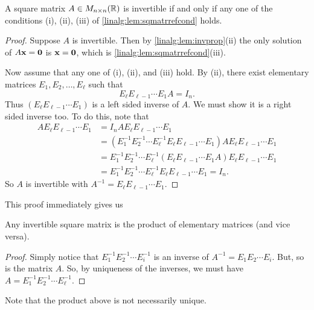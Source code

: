 \documentclass[10pt, a4paper]{article}
\begin{document}
\begin{theorem}\label{linalg:thm:fundthmofinvertmatr}
    A square matrix $A \in M_{n \times n}(\mathbb{R})$ is invertible if and only if any one of the conditions (i), (ii), (iii) of \autoref{linalg:lem:sqmatrrefcond} holds.
    \begin{proof}
        Suppose $A$ is invertible.
        Then by \autoref{linalg:lem:invprop}(ii) the only solution of $A\mathbf{x} = \mathbf{0}$ is $\mathbf{x} = \mathbf{0}$,
        which is \autoref{linalg:lem:sqmatrrefcond}(iii).

        Now assume that any one of (i), (ii), and (iii) hold.
        By (ii), there exist elementary matrices $E_1, E_2, \dotsc, E_\ell$ such that
        \[
        E_\ell E_{\ell - 1} \dotsi E_1 A = I_n.
        \]
        Thus $(E_\ell E_{\ell - 1} \dotsi E_1)$ is a left sided inverse of $A$.
        We must show it is a right sided inverse too.
        To do this, note that
        \begin{align*}
            AE_\ell E_{\ell - 1} \dotsi E_1 &= I_n A E_\ell E_{\ell - 1} \dotsi E_1 \\
            &= (E_1 ^ {-1} E_2 ^ {-1} \dotsi E_{\ell} ^ {-1}E_\ell E_{\ell - 1} \dotsi E_1)AE_\ell E_{\ell - 1} \dotsi E_1 \\
            &= E_1 ^ {-1} E_2 ^ {-1} \dotsi E_{\ell} ^ {-1}(E_\ell E_{\ell - 1} \dotsi E_1A)E_\ell E_{\ell - 1} \dotsi E_1 \\
            &= E_1 ^ {-1} E_2 ^ {-1} \dotsi E_{\ell} ^ {-1}E_\ell E_{\ell - 1} \dotsi E_1 = I_n.
        \end{align*}
        So $A$ is invertible with $A ^ {-1} = E_\ell E_{\ell - 1} \dotsi E_1$.
    \end{proof}
\end{theorem}
This proof immediately gives us
\begin{corollary}\label{pre:linalg:col:invisprodofele}
    Any invertible square matrix is the product of elementary matrices (and vice versa).
    \begin{proof}
        Simply notice that $E_1 ^ {-1}E_2 ^ {-1} \dotsi E_i ^ {-1}$ is an inverse of $A ^ {-1} = E_1E_2 \dotsi E_i$.
        But, so is the matrix $A$.
        So, by uniqueness of the inverses,
        we must have $A = E_1 ^ {-1} E_2 ^ {-1} \dotsi E_\ell ^ {-1}$.
    \end{proof}
\end{corollary}

\begin{remark}
    Note that the product above is not necessarily unique.
\end{remark}
\end{document}
